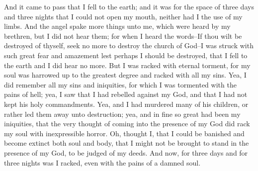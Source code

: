 And it came to pass that I fell to the earth; and it was for the space of three days and three nights that I could not open my mouth, neither had I the use of my limbs.
\bverse \iffalse And the angel spake more things unto me, which were heard by my brethren, but I did not hear them; for when I heard the words--If thou wilt be destroyed of thyself, seek no more to destroy the church of God--I was struck with such great fear and amazement lest perhaps I should be destroyed, that I fell to the earth and I did hear no more. \fi
And the angel spake more things unto me, which were heard by my brethren, but I did not hear them; for when I heard the words--If thou wilt be destroyed of thyself, seek no more to destroy the church of God--I was struck with such great fear and amazement lest perhaps I should be destroyed, that I fell to the earth and I did hear no more.
\bverse \iffalse But I was racked with eternal torment, for my soul was harrowed up to the greatest degree and racked with all my sins. \fi
But I was racked with eternal torment, for my soul was harrowed up to the greatest degree and racked with all my sins.
\bverse \iffalse Yea, I did remember all my sins and iniquities, for which I was tormented with the pains of hell; yea, I saw that I had rebelled against my God, and that I had not kept his holy commandments. \fi
Yea, I did remember all my sins and iniquities, for which I was tormented with the pains of hell; yea, I saw that I had rebelled against my God, and that I had not kept his holy commandments.
\bverse \iffalse Yea, and I had murdered many of his children, or rather led them away unto destruction; yea, and in fine so great had been my iniquities, that the very thought of coming into the presence of my God did rack my soul with inexpressible horror. \fi
Yea, and I had murdered many of his children, or rather led them away unto destruction; yea, and in fine so great had been my iniquities, that the very thought of coming into the presence of my God did rack my soul with inexpressible horror.
\bverse \iffalse Oh, thought I, that I could be banished and become extinct both soul and body, that I might not be brought to stand in the presence of my God, to be judged of my deeds. \fi
Oh, thought I, that I could be banished and become extinct both soul and body, that I might not be brought to stand in the presence of my God, to be judged of my deeds.
\bverse \iffalse And now, for three days and for three nights was I racked, even with the pains of a damned soul. \fi
And now, for three days and for three nights was I racked, even with the pains of a damned soul.
